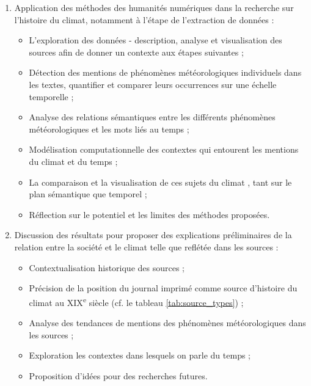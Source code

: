 \documentclass[a4paper,twoside,12pt]{article}
\begin{document}
\vspace{1ex}
\begin{enumerate}
    \item Application des méthodes des humanités numériques dans la recherche sur l'histoire du climat, notamment à l'étape de l'extraction de données :
    \begin{itemize}[label=$\bullet$]
        \item L'exploration des données - description, analyse et visualisation des sources afin de donner un contexte aux étapes suivantes ;
        \item Détection des mentions de phénomènes météorologiques individuels dans les textes, quantifier et comparer leurs occurrences sur une échelle temporelle ;
        \item Analyse des relations sémantiques entre les différents phénomènes météorologiques et les mots liés au temps ;
        \item Modélisation computationnelle des contextes qui entourent les mentions du climat et du temps ;
        \item La comparaison et la visualisation de ces \og sujets du climat \fg{}, tant sur le plan sémantique que temporel ;
        \item Réflection sur le potentiel et les limites des méthodes proposées.
    \end{itemize}
    
    \item Discussion des résultats pour proposer des explications préliminaires de la relation entre la société et le climat telle que reflétée dans les sources :
    \begin{itemize}[label=$\bullet$]
        \item Contextualisation historique des sources ;
        \item Précision de la position du journal imprimé comme source d'histoire du climat au XIX\textsuperscript{e} siècle (cf. le tableau \ref{tab:source_types}) ;
        \item Analyse des tendances de mentions des phénomènes météorologiques dans les sources ;
        \item Exploration les contextes dans lesquels on parle du temps ;
        \item Proposition d'idées pour des recherches futures.
    \end{itemize}
\end{enumerate}
\vspace{1ex}
\clearpage
\end{document}

